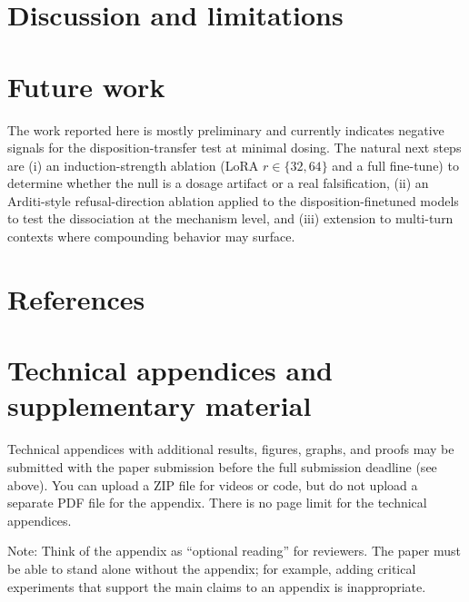 \documentclass{article}
\begin{document}
\section{Discussion and limitations}



\section{Future work}

The work reported here is mostly preliminary and currently indicates negative
signals for the disposition-transfer test at minimal dosing. The natural next
steps are (i) an induction-strength ablation (LoRA $r\in\{32,64\}$ and a full
fine-tune) to determine whether the null is a dosage artifact or a real
falsification, (ii) an Arditi-style refusal-direction ablation applied to
the disposition-finetuned models to test the dissociation at the mechanism
level, and (iii) extension to multi-turn contexts where compounding behavior
may surface.


\section*{References}

\small





\appendix

\section{Technical appendices and supplementary material}
Technical appendices with additional results, figures, graphs, and proofs may be submitted with the paper submission before the full submission deadline (see above). You can upload a ZIP file for videos or code, but do not upload a separate PDF file for the appendix. There is no page limit for the technical appendices. 

Note: Think of the appendix as ``optional reading'' for reviewers. The paper must be able to stand alone without the appendix; for example, adding critical experiments that support the main claims to an appendix is inappropriate. 


\newpage
% 
\end{document}
